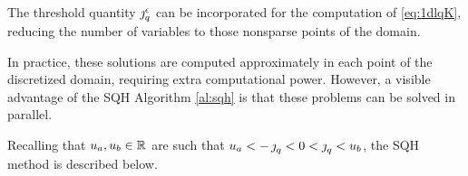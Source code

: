 {The threshold quantity $\operatorname{\jmath}^\epsilon_q$ can be incorporated for the computation of  \eqref{eq:1dlqK}, reducing the number of variables to those nonsparse points of the domain.

In practice, these solutions are computed approximately in each point of the discretized domain, requiring extra computational power.  However, a visible advantage of the SQH Algorithm \ref{al:sqh} is that these problems can be solved in parallel.

Recalling that  $u_a,u_b\in \mathbb{R}$ are such that $u_a<-\operatorname{\jmath}_q<0<\operatorname{\jmath}_q<u_b$, the SQH method is described below. %

}
